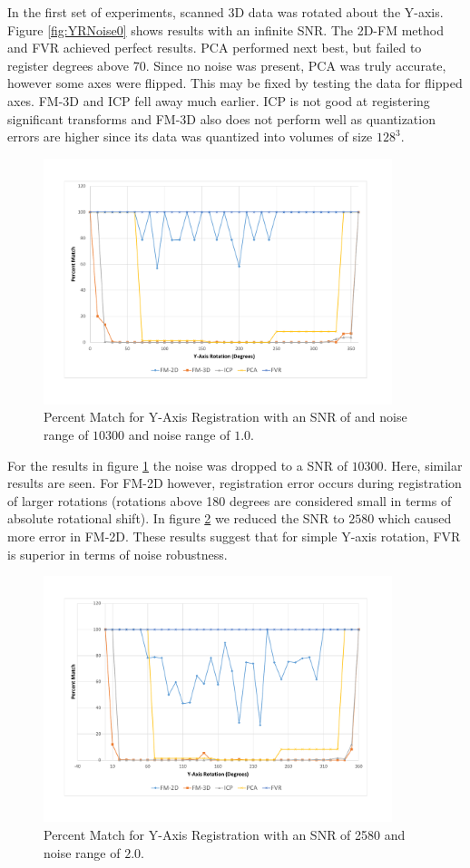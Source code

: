 In the first set of experiments, scanned 3D data was rotated about the Y-axis. Figure \ref{fig:YRNoise0} shows results with an infinite SNR. The 2D-FM method and FVR achieved perfect results. PCA performed next best, but failed to register degrees above 70. Since no noise was present, PCA was truly accurate, however some axes were flipped. This may be fixed by testing the data for flipped axes. FM-3D and ICP fell away much earlier. ICP is not good at registering significant transforms and FM-3D also does not perform well as quantization errors are higher since its data was quantized into volumes of size $128^3$. \\

\begin{figure}[!htb]
\centering
\includegraphics[width=4.0in]{images/results/noise/YRNoise1}
\caption{Percent Match for Y-Axis Registration with an SNR of and noise range of $10300$ and noise range of $1.0$.}
\label{fig:YRNoise1}
\end{figure}

For the results in figure \ref{fig:YRNoise1} the noise was dropped to a SNR of $10300$. Here, similar results are seen. For FM-2D however, registration error occurs during registration of larger rotations (rotations above 180 degrees are considered small in terms of absolute rotational shift). In figure \ref{fig:YRNoise2} we reduced the SNR to $2580$ which caused more error in FM-2D. These results suggest that for simple Y-axis rotation, FVR is superior in terms of noise robustness.  \\

\begin{figure}[!htb]
\centering
\includegraphics[width=4.0in]{images/results/noise/YRNoise2}
\caption{Percent Match for Y-Axis Registration with an SNR of 2580 and noise range of $2.0$.}
\label{fig:YRNoise2}
\end{figure}

